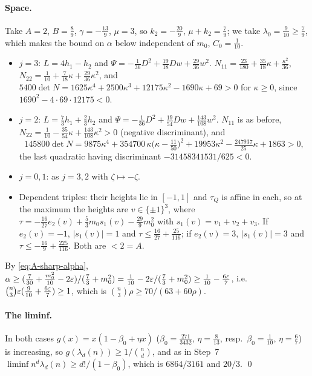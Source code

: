 \paragraph{Space.} Take $A = 2$, $B = \frac89$, $\gamma = -\frac{13}{9}$, $\mu = 3$, so
$k_2 = -\frac{20}{9}$, $\mu + k_2 = \frac79$; we take $\lambda_0 = \frac{9}{10} \ge \frac79$, which makes the
bound on $\alpha$ below independent of $m_0$,
$C_0 = \frac1{10}$.
\begin{itemize}
  \item $j = 3$: $L = 4h_1 - h_2$ and $\Psi = -\frac{1}{36}D^2 + \frac{19}{18}Dw + \frac{29}{36}w^2$.
    $N_{11} = \frac{23}{180} + \frac{35}{18}\kappa + \frac{\kappa^2}{36}$,
    $N_{22} = \frac1{10} + \frac7{18}\kappa + \frac{29}{36}\kappa^2$, and
    $5400\det N = 1625\kappa^4 + 2500\kappa^3 + 12175\kappa^2 - 1690\kappa + 69 > 0$ for $\kappa \ge 0$,
    since $1690^2 - 4 \cdot 69 \cdot 12175 < 0$.
  \item $j = 2$: $L = \frac73h_1 + \frac23h_2$ and $\Psi = -\frac{1}{36}D^2 + \frac{19}{54}Dw + \frac{143}{108}w^2$.
    $N_{11}$ is as before, $N_{22} = \frac1{10} - \frac{35}{54}\kappa + \frac{143}{108}\kappa^2 > 0$
    (negative discriminant), and
    \[
      145800\det N = 9875\kappa^4 + 354700\,\kappa\bigl(\kappa - \tfrac{11}{50}\bigr)^2 + 19953\kappa^2
        - \tfrac{247937}{25}\kappa + 1863 > 0,
    \]
    the last quadratic having discriminant $-31458341531/625 < 0$.
  \item $j = 0, 1$: as $j = 3, 2$ with $\zeta \mapsto -\zeta$.
  \item Dependent triples: their heights lie in $[-1, 1]$ and $\tau_Q$ is affine in each, so at the
    maximum the heights are $v \in \{\pm1\}^3$, where
    $\tau = -\frac{16}{27}e_2(v) + \frac53m_0s_1(v) - \frac{29}{9}m_0^2$ with $s_1(v) = v_1 + v_2 + v_3$. If
    $e_2(v) = -1$, $|s_1(v)| = 1$ and $\tau \le \frac{16}{27} + \frac{25}{116}$; if $e_2(v) = 3$, $|s_1(v)| = 3$
    and $\tau \le -\frac{16}{9} + \frac{225}{116}$. Both are $< 2 = A$.
\end{itemize}
By \eqref{eq:A-sharp-alpha}, $\alpha \ge (\frac{7}{30} + \frac{m_0^2}{10} - 2\varepsilon)/(\frac73 + m_0^2)
= \frac1{10} - 2\varepsilon/(\frac73 + m_0^2) \ge \frac1{10} - \frac{6\varepsilon}{7}$, i.e.
$\binom n3\varepsilon(\frac9{10} + \frac{6\varepsilon}7) \ge 1$, which is $\binom n3\rho \ge 70/(63 + 60\rho)$.

\paragraph{The liminf.} In both cases $g(x) = x(1 - \beta_0 + \eta x)$ ($\beta_0 = \frac{271}{3432}$,
$\eta = \frac8{13}$, resp.\ $\beta_0 = \frac1{10}$, $\eta = \frac67$) is increasing, so
$g(\lambda_d(n)) \ge 1/\binom nd$, and as in Step~7 $\liminf n^d\lambda_d(n) \ge d!/(1 - \beta_0)$, which is
$6864/3161$ and $20/3$. \qed

